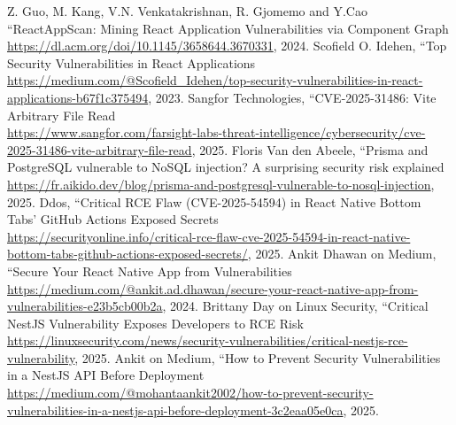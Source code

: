 \documentclass[conference]{IEEEtran}
\begin{document}
\begin{thebibliography}{00}
 Z. Guo, M. Kang, V.N. Venkatakrishnan, R. Gjomemo and Y.Cao ``ReactAppScan: Mining React Application Vulnerabilities via Component Graph \url{https://dl.acm.org/doi/10.1145/3658644.3670331}, 2024.
 Scofield O. Idehen, ``Top Security Vulnerabilities in React Applications \url{https://medium.com/@Scofield_Idehen/top-security-vulnerabilities-in-react-applications-b67f1c375494}, 2023.
 Sangfor Technologies, ``CVE-2025-31486: Vite Arbitrary File Read \\ \url{https://www.sangfor.com/farsight-labs-threat-intelligence/cybersecurity/cve-2025-31486-vite-arbitrary-file-read}, 2025.
 Floris Van den Abeele, ``Prisma and PostgreSQL vulnerable to NoSQL injection? A surprising security risk explained \url{https://fr.aikido.dev/blog/prisma-and-postgresql-vulnerable-to-nosql-injection}, 2025.
 Ddos, ``Critical RCE Flaw (CVE-2025-54594) in React Native Bottom Tabs’ GitHub Actions Exposed Secrets \\ \url{https://securityonline.info/critical-rce-flaw-cve-2025-54594-in-react-native-bottom-tabs-github-actions-exposed-secrets/}, 2025.
 Ankit Dhawan on Medium, ``Secure Your React Native App from Vulnerabilities \url{https://medium.com/@ankit.ad.dhawan/secure-your-react-native-app-from-vulnerabilities-e23b5cb00b2a}, 2024.
 Brittany Day on Linux Security,  ``Critical NestJS Vulnerability Exposes Developers to RCE Risk \url{https://linuxsecurity.com/news/security-vulnerabilities/critical-nestjs-rce-vulnerability}, 2025.
 Ankit on Medium, ``How to Prevent Security Vulnerabilities in a NestJS API Before Deployment \\ \url{https://medium.com/@mohantaankit2002/how-to-prevent-security-vulnerabilities-in-a-nestjs-api-before-deployment-3c2eaa05e0ca}, 2025.

\end{thebibliography}
\end{document}

